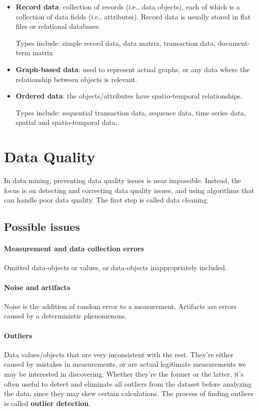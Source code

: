 \begin{itemize}
    \item \textbf{Record data}: collection of records (i.e., data objects), each of which is a collection of data fields (i.e., attributes). Record data is usually stored in flat files or relational databases.

    Types include: simple record data, data matrix, transaction data, document-
    term matrix

    \item \textbf{Graph-based data}: used to represent actual graphs, or any data where the relationship between objects is relevant.

    \item \textbf{Ordered data}: the objects/attributes have spatio-temporal relationships.

    Types include: sequential transaction data, sequence data, time series data, spatial and spatio-temporal data.
\end{itemize}


\section{Data Quality}

In data mining, preventing data quality issues is near impossible. Instead, the focus is on detecting and correcting data quality issues, and using algorithms that can handle poor data quality. The first step is called data cleaning.

\subsection{Possible issues}

\paragraph{Measurement and data collection errors}
Omitted data-objects or values, or data-objects inappropriately included.

\paragraph{Noise and artifacts}
Noise is the addition of random error to a measurement. Artifacts are errors caused by a deterministic phenomenons.

\paragraph{Outliers}
Data values/objects that are very inconsistent with the rest. They're either caused by mistakes in measurements, or are actual legitimate measurements we may be interested in discovering. Whether they're the former or the latter, it's often useful to detect and eliminate all outliers from the dataset before analyzing the data, since they may skew certain calculations. The process of finding outliers is called \textbf{outlier detection}.

